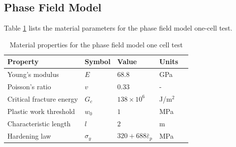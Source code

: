 \documentclass[sn-mathphys,Numbered]{sn-jnl}%
\begin{document}
\begin{appendices}
\subsection{Phase Field Model}
Table \ref{tab:material_properties_PF_one_elem} lists the material parameters for the phase field model one-cell test.
\begin{table}[htb]
	\centering
		\begin{tabular}{lllll} \hline
			Property & Symbol & Value & Units \\ \hline 
			Young's modulus & $E$ & $68.8$ & GPa \\
			Poisson's ratio & $v$ & $0.33$  & - \\
			Critical fracture energy & $G_c$ & $138\times10^6$ &  J/m$^2$ \\
   		Plastic work threshold & $w_0$ & $1$ &  MPa \\
			Characteristic length & $l$ & $2$ & m   \\
			Hardening law & $\sigma_y$ & $320+688{\bar{\varepsilon}}_p$ & MPa  \\
			\hline
		\end{tabular}
	\caption{Material properties for the phase field model one cell test}
	\label{tab:material_properties_PF_one_elem}
\end{table}


\end{appendices}
\end{document}
